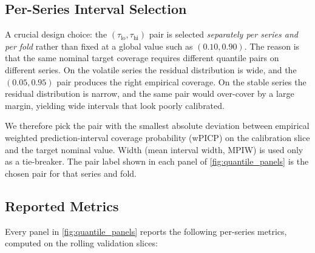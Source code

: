\subsection{Per-Series Interval Selection}
\label{sec:quantile:selection}

A crucial design choice: the $(\tau_{\text{lo}}, \tau_{\text{hi}})$ pair is selected \emph{separately per series and per fold} rather than fixed at a global value such as $(0.10, 0.90)$. The reason is that the same nominal target coverage requires different quantile pairs on different series. On the volatile series the residual distribution is wide, and the $(0.05, 0.95)$ pair produces the right empirical coverage. On the stable series the residual distribution is narrow, and the same pair would over-cover by a large margin, yielding wide intervals that look poorly calibrated.

We therefore pick the pair with the smallest absolute deviation between empirical weighted prediction-interval coverage probability (wPICP) on the calibration slice and the target nominal value. Width (mean interval width, MPIW) is used only as a tie-breaker. The pair label shown in each panel of \cref{fig:quantile_panels} is the chosen pair for that series and fold.

\subsection{Reported Metrics}
\label{sec:quantile:metrics}

Every panel in \cref{fig:quantile_panels} reports the following per-series metrics, computed on the rolling validation slices:

